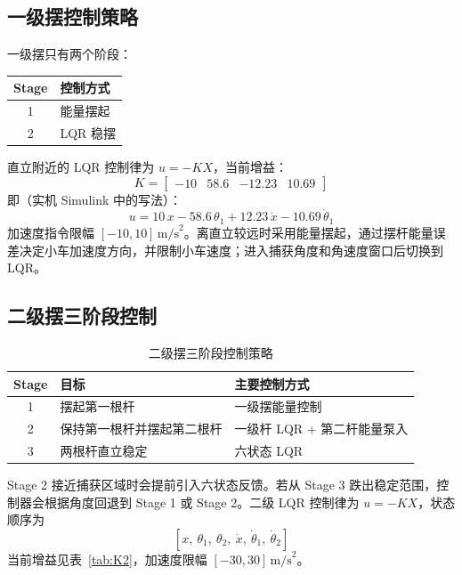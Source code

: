\documentclass[12pt,a4paper]{article}
\begin{document}
\subsection{一级摆控制策略}

一级摆只有两个阶段：

\begin{center}
    \renewcommand{\arraystretch}{1.4}
    \begin{tabular}{@{}c l@{}}
        \toprule
        \textbf{Stage} & \textbf{控制方式} \\
        \midrule
        1 & 能量摆起 \\
        2 & LQR 稳摆 \\
        \bottomrule
    \end{tabular}
\end{center}

直立附近的 LQR 控制律为 $u = -KX$，当前增益：
\[
    K = \begin{bmatrix} -10 & 58.6 & -12.23 & 10.69 \end{bmatrix}
\]
即（实机 Simulink 中的写法）：
\[
    u = 10\,x - 58.6\,\theta_1 + 12.23\,\dot{x} - 10.69\,\dot{\theta}_1
\]
加速度指令限幅 $[-10,10]\,\text{m/s}^2$。离直立较远时采用能量摆起，通过摆杆能量误差决定小车加速度方向，并限制小车速度；进入捕获角度和角速度窗口后切换到 LQR。

\subsection{二级摆三阶段控制}

\begin{table}[htbp]
    \centering
    \caption{二级摆三阶段控制策略}
    \label{tab:stages2}
    \renewcommand{\arraystretch}{1.4}
    \begin{tabular}{@{}c p{4.6cm} p{7.2cm}@{}}
        \toprule
        \textbf{Stage} & \textbf{目标} & \textbf{主要控制方式} \\
        \midrule
        1 & 摆起第一根杆 & 一级摆能量控制 \\
        2 & 保持第一根杆并摆起第二根杆 & 一级杆 LQR + 第二杆能量泵入 \\
        3 & 两根杆直立稳定 & 六状态 LQR \\
        \bottomrule
    \end{tabular}
\end{table}

Stage 2 接近捕获区域时会提前引入六状态反馈。若从 Stage 3 跌出稳定范围，控制器会根据角度回退到 Stage 1 或 Stage 2。二级 LQR 控制律为 $u = -KX$，状态顺序为
\[
    [x,\ \theta_1,\ \theta_2,\ \dot{x},\ \dot{\theta}_1,\ \dot{\theta}_2]
\]
当前增益见表~\ref{tab:K2}，加速度限幅 $[-30,30]\,\text{m/s}^2$。
\end{document}
